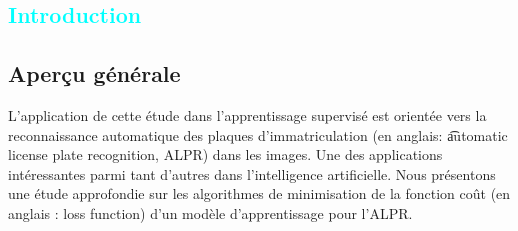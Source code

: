 

\textcolor{cyan}{\chapter{Introduction}}
	\section{Aperçu générale}
	
		
		
		L’application de cette étude dans l’apprentissage supervisé est orientée vers la reconnaissance automatique des plaques d’immatriculation (en anglais: \t{automatic license plate recognition, ALPR}) dans les images. Une des applications intéressantes parmi tant d'autres dans l'intelligence artificielle. Nous présentons une étude approfondie sur les algorithmes de minimisation de la fonction coût (en anglais : loss function) d’un modèle d’apprentissage pour l'ALPR. 
		
